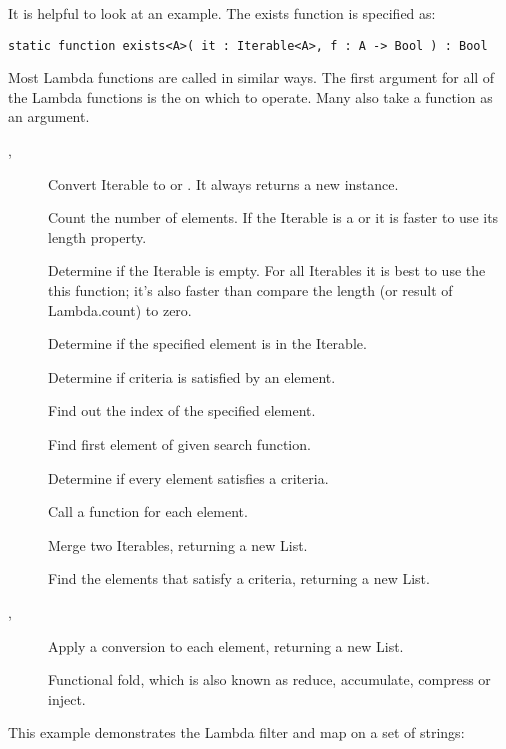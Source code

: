 It is helpful to look at an example. The exists function is specified as:

\begin{lstlisting}
static function exists<A>( it : Iterable<A>, f : A -> Bool ) : Bool
\end{lstlisting}

Most Lambda functions are called in similar ways. The first argument for all of the Lambda functions is the  on which to operate. Many also take a function as an argument.

\begin{description}
	\item[, ] Convert Iterable to  or . It always returns a new instance.
	\item[] Count the number of elements.  If the Iterable is a  or  it is faster to use its length property.
	\item[] Determine if the Iterable is empty. For all Iterables it is best to use the this function; it's also faster than compare the length (or result of Lambda.count) to zero.
	\item[] Determine if the specified element is in the Iterable.
	\item[] Determine if criteria is satisfied by an element.
	\item[] Find out the index of the specified element.
	\item[] Find first element of given search function.
	\item[] Determine if every element satisfies a criteria.
	\item[] Call a function for each element.
	\item[] Merge two Iterables, returning a new List.
	\item[] Find the elements that satisfy a criteria, returning a new List.
	\item[, ] Apply a conversion to each element, returning a new List.
	\item[] Functional fold, which is also known as reduce, accumulate, compress or inject.
\end{description}

This example demonstrates the Lambda filter and map on a set of strings:

